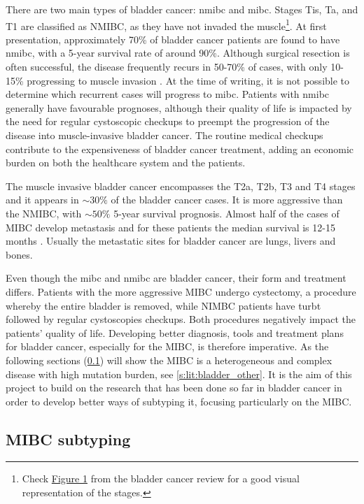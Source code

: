 There are two main types of bladder cancer: \acrfull{nmibc} and \acrlong{mibc}. Stages Tis, Ta, and T1 are classified as NMIBC, as they have not invaded the muscle\footnote{Check \href{https://www.nature.com/articles/nrc3817/figures/1}{Figure 1} from the bladder cancer review \citep{Knowles2015-mu} for a good visual representation of the stages.}. At first presentation, approximately 70\% of bladder cancer patients are found to have \acrfull{nmibc}, with a 5-year survival rate of around 90\%. Although surgical resection is often successful, the disease frequently recurs in 50-70\% of cases, with only 10-15\% progressing to muscle invasion \cite{Knowles2015-mu}. At the time of writing, it is not possible to determine which recurrent cases will progress to \acrlong{mibc}. Patients with \acrshort{nmibc} generally have favourable prognoses, although their quality of life is impacted by the need for regular cystoscopic checkups to preempt the progression of the disease into muscle-invasive bladder cancer. The routine medical checkups contribute to the expensiveness of bladder cancer treatment, adding an economic burden on both the healthcare system and the patients.

The muscle invasive bladder cancer encompasses the T2a, T2b, T3 and T4 stages and it appears in $\sim30\%$ of the bladder cancer cases. It is more aggressive than the NMIBC, with $\sim50\%$ 5-year survival prognosis. Almost half of the cases of MIBC develop metastasis and for these patients the median survival is 12-15 months \cite{Knowles2015-mu}. Usually the metastatic sites for bladder cancer are lungs, livers and bones.

Even though the \acrshort{mibc} and \acrshort{nmibc} are bladder cancer, their form and treatment differs. Patients with the more aggressive MIBC undergo cystectomy, a procedure whereby the entire bladder is removed, while NIMBC patients have \acrfull{turbt} followed by regular cystoscopies checkups. Both procedures negatively impact the patients' quality of life. Developing better diagnosis, tools and treatment plans for bladder cancer, especially for the MIBC, is therefore imperative. As the following sections (\cref{s:lit:subtypes_mibc}) will show the MIBC is a heterogeneous and complex disease with high mutation burden, see \cref{s:lit:bladder_other}. It is the aim of this project to build on the research that has been done so far in bladder cancer in order to develop better ways of subtyping it, focusing particularly on the MIBC.

\subsection{MIBC subtyping} \label{s:lit:subtypes_mibc}

